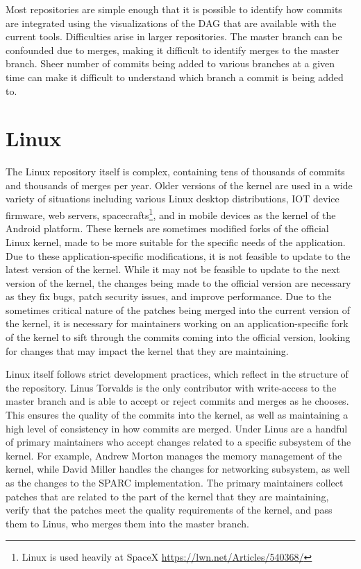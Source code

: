 Most repositories are simple enough that it is possible to identify how
commits are integrated using the visualizations of the DAG that are
available with the current tools.
Difficulties arise in larger repositories.
The master branch can be confounded due to \foxtrot{}
merges, making it difficult to identify merges to the master branch.
Sheer number of commits being added to various branches at a given
time can make it difficult to understand which branch a commit is
being added to.

\section{Linux}\label{sec:linux}

The Linux repository itself is complex,
containing tens of thousands of commits and thousands of merges per year.
Older versions of the kernel are used in a wide
variety of situations including various Linux desktop distributions,
IOT device firmware, web servers,
spacecrafts\footnote{Linux is used heavily at SpaceX
  \url{https://lwn.net/Articles/540368/}}, and in mobile devices as the
kernel of the Android platform.
These kernels are sometimes modified forks of the official Linux kernel,
made to be more suitable for the specific needs of the application.
Due to these application-specific modifications,
it is not feasible to update to the latest version of the
kernel.
While it may not be feasible to update to the next version of the kernel,
the changes being made to the official version are necessary as they fix bugs,
patch security issues, and improve performance.
Due to the sometimes critical nature of
the patches being merged into the current version of the kernel, it is
necessary for maintainers working on an application-specific fork of the
kernel to sift through the commits coming into the official version,
looking for changes that may impact the kernel that they are
maintaining.

Linux itself follows strict development practices,
which reflect in the structure of the repository.
Linus Torvalds is the only contributor with write-access to the master
branch and is able to accept or reject commits and merges as he chooses.
This ensures the quality of the commits into the kernel, as well as
maintaining a high level of consistency in how commits are merged.
Under Linus are a handful of primary maintainers who accept changes
related to a specific subsystem of the kernel.
For example, Andrew Morton manages the memory management of the kernel,
while David Miller handles the changes for networking subsystem, as well
as the changes to the SPARC implementation.
The primary maintainers collect patches that are related to the part of
the kernel that they are maintaining, verify that the patches meet the
quality requirements of the kernel, and pass them to Linus, who
merges them into the master branch.

